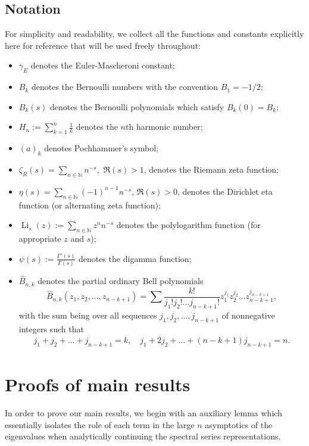 \documentclass[letterpaper,10pt]{amsart}
\newcommand{\N}{\mathbb N}
\DeclareMathOperator{\Li}{Li}
\numberwithin{equation}{section}
\begin{document}
\subsection{Notation}\label{S:Notation}
For simplicity and readability, we collect all the functions and constants explicitly here for reference that will be used freely throughout:
\begin{itemize}
    \item $\gamma_E$ denotes the Euler-Mascheroni constant;
    \item $B_k$ denotes the Bernoulli numbers with the convention $B_1=-1/2$;
    \item $B_k(s)$ denotes the Bernoulli polynomials which satisfy $B_k(0)=B_k$;
    \item $H_n:=\sum_{k=1}^n \frac{1}{k}$ denotes the $n$th harmonic number;
    \item $(a)_k$ denotes Pochhammer's symbol;
    \item $\zeta_R(s)=\sum_{n\in\mathbb{N}}n^{-s},$ $\Re(s)>1$, denotes the Riemann zeta function;
    \item $\eta(s)=\sum_{n\in\mathbb{N}}(-1)^{n-1}n^{-s}$, $\Re(s)>0$, denotes the Dirichlet eta function (or alternating zeta function);
    \item $\Li_s(z) :=\sum_{n\in \N}z^n n^{-s}$ denotes the polylogarithm function (for appropriate $z$ and $s$);
    \item $\psi(s) :=\frac{\Gamma'(s)}{\Gamma(s)}$ denotes the digamma function;
    \item $\widehat{B}_{n,k}$ denotes the \textup{partial ordinary Bell polynomials} \cite[p. 136]{Co74} \begin{equation}
\widehat{B}_{n,k}(z_1,z_2,\dots,z_{n-k+1})=\sum \frac{k!}{j_1!j_2!\dots j_{n-k+1}!}z_1^{j_1} z_2^{j_2} \dots z_{n-k+1}^{j_{n-k+1}},
\end{equation}
with the sum being over all sequences $j_1,j_2,\dots,j_{n-k+1}$ of nonnegative integers such that
\begin{align}
j_1+j_2+\dots+j_{n-k+1}=k,\quad j_1+2j_2+\dots+(n-k+1)j_{n-k+1}=n.
\end{align}
\end{itemize}


\section{Proofs of main results}\label{S2}

In order to prove our main results, we begin with an auxiliary lemma which essentially isolates the role of each term in the large $n$ asymptotics of the eigenvalues when analytically continuing the spectral series representations.
\end{document}
